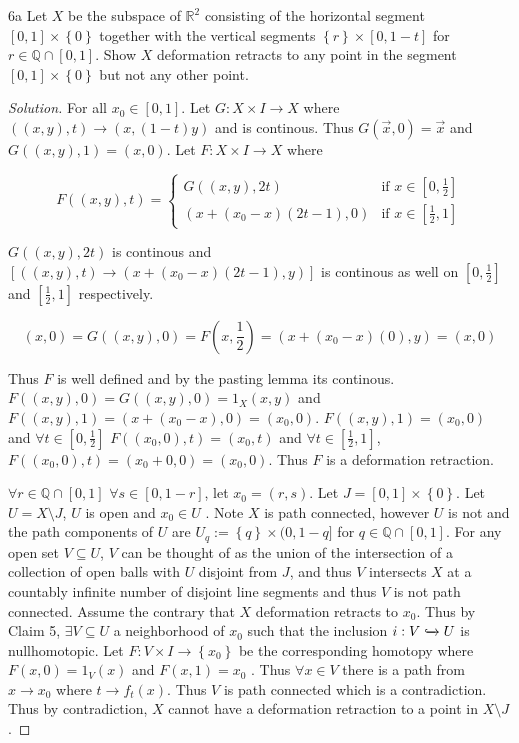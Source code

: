 \documentclass{article}
\newcommand*{\subeq}{\subseteq}
\newcommand{\R}{\mathbb{R}}
\newcommand{\Q}{\mathbb{Q}}
\newenvironment{solution}
{\renewcommand\qedsymbol{$\blacksquare$}\begin{proof}[Solution]}
{\end{proof}}
\begin{document}
\begin{PROB}{6a}\label{Problem 6a.}
    Let $X$ be the subspace of $\R^2$ consisting of the horizontal segment $[0, 1] \times \left\{ 0 \right\}$ together with the vertical segments $\left\{ r \right\} \times [0, 1- t]$  for $r \in \Q \cap [0, 1]$. Show $X$ deformation retracts to any point in the segment $\left[0, 1\right] \times \left\{ 0 \right\}$ but not any other point.     
\end{PROB}
\begin{solution}
    For all $x_0 \in [0, 1]$.  
    Let $G: X \times I \to X$ where $((x, y), t) \to (x, (1 - t)y)$ and is continous. Thus $G(\vec{x}, 0) = \vec{x}$ and $G((x, y), 1) = (x, 0)$. Let $F: X \times I \to X$ where 
    
    \begin{equation*}
        F((x, y), t) = \begin{cases*}
            G((x, y), 2t) & \text{if $x \in [0, \frac{1}{2}]$} \\
            (x + (x_0 - x)(2t - 1), 0) & \text{if $x \in [\frac{1}{2}, 1]$}
        \end{cases*}
    \end{equation*}

    $G((x, y), 2t)$ is continous and $[((x, y), t) \to (x + (x_0 - x)(2t - 1), y)]$ is continous as well on $[0, \frac{1}{2}]$ and $[\frac{1}{2}, 1]$ respectively. 
    
    \[(x, 0) = G((x, y), 0) = F\left(x, \frac{1}{2}\right) = (x + (x_0 - x)(0), y) = (x, 0)\]

    Thus $F$ is well defined and by the pasting lemma its continous. $F((x, y), 0) = G((x, y), 0) = 1_X(x, y)$ and $F((x, y), 1) = (x + (x_0 - x), 0) = (x_0, 0)$. $F((x, y), 1) = (x_0, 0)$ and $\forall t \in [0, \frac{1}{2}]$ $F((x_0, 0), t) = (x_0, t)$ and $\forall t \in [\frac{1}{2}, 1]$, $F((x_0, 0), t) = (x_0 + 0, 0) = (x_0, 0)$. Thus $F$ is a deformation retraction.
    
    $\forall r \in \Q \cap [0, 1]$ $\forall s \in [0, 1 - r]$, let $x_0 = (r, s)$. Let $J = [0, 1] \times \left\{ 0 \right\}$. Let $U = X \setminus J$, $U$ is open and $x_0 \in U$ . Note $X$ is path connected, however $U$ is not and the path components of $U$ are $U_q := \left\{ q \right\} \times (0, 1 - q]$ for $q \in \Q \cap [0, 1]$. For any open set $V \subeq U$, $V$ can be thought of as the union of the intersection of a collection of open balls with $U$ disjoint from $J$, and thus $V$ intersects $X$ at a countably infinite number of disjoint line segments and thus $V$ is not path connected. Assume the contrary that $X$ deformation retracts to $x_0$. Thus by Claim 5, $\exists V \subeq U  $ a neighborhood of $x_0$ such that the inclusion $i: V \xhookrightarrow{} U$ is nullhomotopic. Let $F: V \times I  \to \left\{ x_0 \right\}$ be the corresponding homotopy where $F(x, 0) = 1_V(x)$ and $F(x, 1) = x_0$  . Thus $\forall x \in V$ there is a path from $x \to x_0$ where $t \to f_t(x)$. Thus $V$ is path connected which is a contradiction. Thus by contradiction, $X$ cannot have a deformation retraction to a point in $X \setminus J$.                                  
\end{solution}
\end{document}
